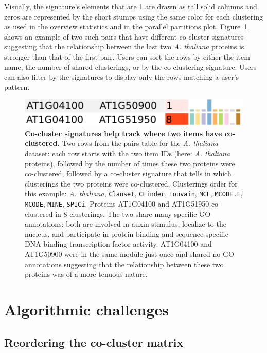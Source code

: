 \documentclass[12pt]{cmuthesis}
\newcommand{\Athal}{\textit{A. thaliana}\xspace}
\begin{document}
  Visually, the signature's elements that are 1 are drawn as tall solid columns and zeros are represented by the short stumps using the same color for each clustering as used in the overview statistics and in the parallel partitions plot. Figure~\ref{fig:coral:signature} shows an example of two such pairs that have different co-cluster signatures suggesting that the relationship between the last two \Athal proteins is stronger than that of the first pair. Users can sort the rows by either the item name, the number of shared clusterings, or by the co-clustering signature. Users can also filter by the signatures to display only the rows matching a user's pattern.

  \begin{figure}[!htb]
    \centering
    \includegraphics[width=0.4\linewidth]{figures/coral_item_pair}
    \caption{\textbf{Co-cluster signatures help track where two items have co-clustered.} Two rows from the pairs table for the \Athal dataset: each row starts with the two item IDs (here: \Athal proteins), followed by the number of times these two proteins were co-clustered, followed by a co-cluster signature that tells in which clusterings the two proteins were co-clustered. Clusterings order for this example: \Athal, \texttt{Clauset}, \texttt{CFinder}, \texttt{Louvain}, \texttt{MCL}, \texttt{MCODE.F}, \texttt{MCODE}, \texttt{MINE}, \texttt{SPICi}. Proteins AT1G04100 and AT1G51950 co-clustered in 8 clusterings. The two share many specific GO annotations: both are involved in auxin stimulus, localize to the nucleus, and participate in protein binding and sequence-specific DNA binding transcription factor activity. AT1G04100 and AT1G50900 were in the same module just once and shared no GO annotations suggesting that the relationship between these two proteins was of a more tenuous nature.}
    \label{fig:coral:signature}
  \end{figure}

\section{Algorithmic challenges}

  \subsection{Reordering the co-cluster matrix}
  \label{sec:coral:reordering}
\end{document}
